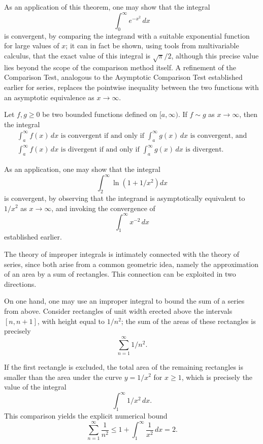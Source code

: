 As an application of this theorem, one may show that the integral \[
\int_0^{\infty} e^{-x^2} \, dx
\] is convergent, by comparing the integrand with a suitable exponential function for large values of $x$; it can in fact be shown, using tools from multivariable calculus, that the exact value of this integral is $\sqrt{\pi}/2$, although this precise value lies beyond the scope of the comparison method itself. A refinement of the Comparison Test, analogous to the Asymptotic Comparison Test established earlier for series, replaces the pointwise inequality between the two functions with an asymptotic equivalence as $x \to \infty$.

\begin{theorem}
Let $f, g \geq 0$ be two bounded functions defined on $[a, \infty)$. If $f \sim g$ as $x \to \infty$, then the integral
\[
\begin{gathered}
\int_a^{\infty} f(x) \, dx
\text{ is convergent if and only if }
\int_a^{\infty} g(x) \, dx
\text{ is convergent, and} \\
\int_a^{\infty} f(x) \, dx
\text{ is divergent if and only if }
\int_a^{\infty} g(x) \, dx
\text{ is divergent.}
\end{gathered}
\]

\end{theorem}

As an application, one may show that the integral \[
\int_2^{\infty} \ln\!\left(1 + 1/x^2\right) dx
\] is convergent, by observing that the integrand is asymptotically equivalent to $1/x^2$ as $x \to \infty$, and invoking the convergence of
\[
\int_1^{\infty} x^{-2} \, dx
\]
established earlier.

The theory of improper integrals is intimately connected with the theory of series, since both arise from a common geometric idea, namely the approximation of an area by a sum of rectangles. This connection can be exploited in two directions.

On one hand, one may use an improper integral to bound the sum of a series from above. Consider rectangles of unit width erected above the intervals $[n, n+1]$, with height equal to $1/n^2$; the sum of the areas of these rectangles is precisely
\[
\sum_{n=1}^{\infty} 1/n^2.
\]

If the first rectangle is excluded, the total area of the remaining rectangles is smaller than the area under the curve $y = 1/x^2$ for $x \geq 1$, which is precisely the value of the integral
\[
\int_1^{\infty} 1/x^2 \, dx.
\]
This comparison yields the explicit numerical bound
\[
\sum_{n=1}^{\infty} \frac{1}{n^2} \leq 1 + \int_1^{\infty} \frac{1}{x^2} \, dx = 2.
\]

